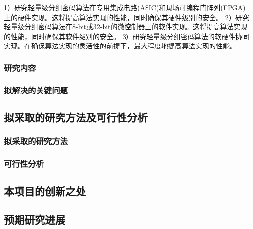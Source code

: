 \documentclass{ctexart}
\begin{document}
1）研究轻量级分组密码算法在专用集成电路(ASIC)和现场可编程门阵列(FPGA)上的硬件实现。这将提高算法实现的性能，同时确保其硬件级别的安全。
2）研究轻量级分组密码算法在8-bit或32-bit的微控制器上的软件实现。这将提高算法实现的性能，同时确保其软件级别的安全。
3）研究轻量级分组密码算法的软硬件协同实现。在确保算法实现的灵活性的前提下，最大程度地提高算法实现的性能。

\subsubsection{研究内容}
\subsubsection{拟解决的关键问题}
\subsection{拟采取的研究方法及可行性分析}
\subsubsection{拟采取的研究方法}
\subsubsection{可行性分析}

\subsection{本项目的创新之处}
\subsection{预期研究进展}
\end{document}
